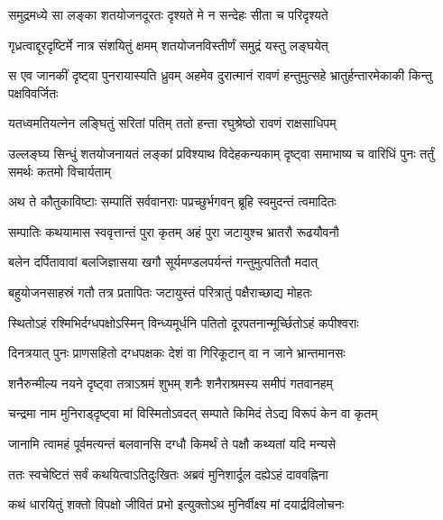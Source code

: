 \twolineshloka
{समुद्रमध्ये सा लङ्का शतयोजनदूरतः}
{दृश्यते मे न सन्देहः सीता च परिदृश्यते} %

\twolineshloka
{गृध्रत्वाद्दूरदृष्टिर्मे नात्र संशयितुं क्षमम्}
{शतयोजनविस्तीर्णं समुद्रं यस्तु लङ्घयेत्} %

\threelineshloka
{स एव जानकीं दृष्ट्वा पुनरायास्यति ध्रुवम्}
{अहमेव दुरात्मानं रावणं हन्तुमुत्सहे}
{भ्रातुर्हन्तारमेकाकी किन्तु पक्षविवर्जितः} %

\twolineshloka
{यतध्वमतियत्नेन लङ्घितुं सरितां पतिम्}
{ततो हन्ता रघुश्रेष्ठो रावणं राक्षसाधिपम्} %

\fourlineindentedshloka
{उल्लङ्घ्य सिन्धुं शतयोजनायतं}
{लङ्कां प्रविश्याथ विदेहकन्यकाम्}
{दृष्ट्वा समाभाष्य च वारिधिं पुनः}
{तर्तुं समर्थः कतमो विचार्यताम्} %





\twolineshloka
{अथ ते कौतुकाविष्टाः सम्पातिं सर्ववानराः}
{पप्रच्छुर्भगवन् ब्रूहि स्वमुदन्तं त्वमादितः} %

\twolineshloka
{सम्पातिः कथयामास स्ववृत्तान्तं पुरा कृतम्}
{अहं पुरा जटायुश्च भ्रातरौ रूढयौवनौ} %

\twolineshloka
{बलेन दर्पितावावां बलजिज्ञासया खगौ}
{सूर्यमण्डलपर्यन्तं गन्तुमुत्पतितौ मदात्} %

\twolineshloka
{बहुयोजनसाहस्रं गतौ तत्र प्रतापितः}
{जटायुस्तं परित्रातुं पक्षैराच्छाद्य मोहतः} %

\twolineshloka
{स्थितोऽहं रश्मिभिर्दग्धपक्षोऽस्मिन् विन्ध्यमूर्धनि}
{पतितो दूरपतनान्मूर्च्छितोऽहं कपीश्वराः} %

\twolineshloka
{दिनत्रयात् पुनः प्राणसहितो दग्धपक्षकः}
{देशं वा गिरिकूटान् वा न जाने भ्रान्तमानसः} %

\twolineshloka
{शनैरुन्मील्य नयने दृष्ट्वा तत्राऽश्रमं शुभम्}
{शनैः शनैराश्रमस्य समीपं गतवानहम्} %

\twolineshloka
{चन्द्रमा नाम मुनिराड्\mbox{}दृष्ट्वा मां विस्मितोऽवदत्}
{सम्पाते किमिदं तेऽद्य विरूपं केन वा कृतम्} %

\twolineshloka
{जानामि त्वामहं पूर्वमत्यन्तं बलवानसि}
{दग्धौ किमर्थं ते पक्षौ कथ्यतां यदि मन्यसे} %

\twolineshloka
{ततः स्वचेष्टितं सर्वं कथयित्वाऽतिदुःखितः}
{अब्रवं मुनिशार्दूल दह्येऽहं दाववह्निना} %

\twolineshloka
{कथं धारयितुं शक्तो विपक्षो जीवितं प्रभो}
{इत्युक्तोऽथ मुनिर्वीक्ष्य मां दयार्द्रविलोचनः} %

